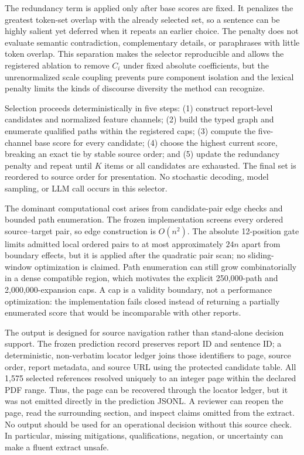 \documentclass[applsci,article,submit,moreauthors]{Definitions/mdpi}
\begin{document}
The redundancy term is applied only after base scores are fixed. It penalizes the greatest token-set overlap with the already selected set, so a sentence can be highly salient yet deferred when it repeats an earlier choice. The penalty does not evaluate semantic contradiction, complementary details, or paraphrases with little token overlap. This separation makes the selector reproducible and allows the registered ablation to remove $C_i$ under fixed absolute coefficients, but the unrenormalized scale coupling prevents pure component isolation and the lexical penalty limits the kinds of discourse diversity the method can recognize.

Selection proceeds deterministically in five steps: (1) construct report-level candidates and normalized feature channels; (2) build the typed graph and enumerate qualified paths within the registered caps; (3) compute the five-channel base score for every candidate; (4) choose the highest current score, breaking an exact tie by stable source order; and (5) update the redundancy penalty and repeat until $K$ items or all candidates are exhausted. The final set is reordered to source order for presentation. No stochastic decoding, model sampling, or LLM call occurs in this selector.

The dominant computational cost arises from candidate-pair edge checks and bounded path enumeration. The frozen implementation screens every ordered source--target pair, so edge construction is $O(n^2)$. The absolute 12-position gate limits admitted local ordered pairs to at most approximately $24n$ apart from boundary effects, but it is applied after the quadratic pair scan; no sliding-window optimization is claimed. Path enumeration can still grow combinatorially in a dense compatible region, which motivates the explicit 250,000-path and 2,000,000-expansion caps. A cap is a validity boundary, not a performance optimization: the implementation fails closed instead of returning a partially enumerated score that would be incomparable with other reports.

The output is designed for source navigation rather than stand-alone decision support. The frozen prediction record preserves report ID and sentence ID; a deterministic, non-verbatim locator ledger joins those identifiers to page, source order, report metadata, and source URL using the protected candidate table. All 1,575 selected references resolved uniquely to an integer page within the declared PDF range. Thus, the page can be recovered through the locator ledger, but it was not emitted directly in the prediction JSONL. A reviewer can reopen the page, read the surrounding section, and inspect claims omitted from the extract. No output should be used for an operational decision without this source check. In particular, missing mitigations, qualifications, negation, or uncertainty can make a fluent extract unsafe.
\end{document}
